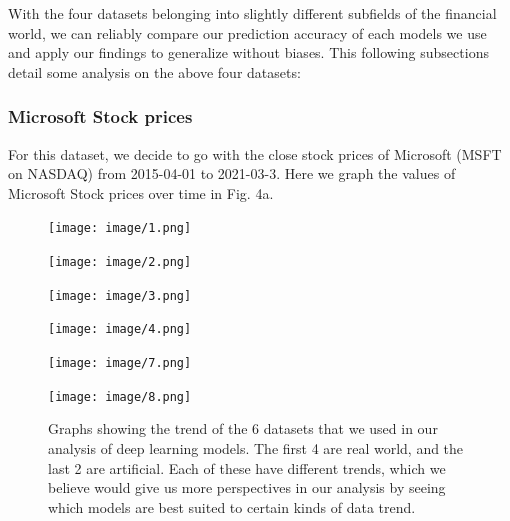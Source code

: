 \documentclass[letterpaper, 10 pt, conference]{ieeeconf}  %
\begin{document}
        With the four datasets belonging into slightly different subfields of the financial world, we can reliably compare our prediction accuracy of each models we use and apply our findings to generalize without biases. This following subsections detail some analysis on the above four datasets:

        \subsubsection{Microsoft Stock prices} For this dataset, we decide to go with the close stock prices of Microsoft (MSFT on NASDAQ) from 2015-04-01 to 2021-03-3. Here we graph the values of Microsoft Stock prices over time in Fig. 4a.
        \begin{figure}
            \centering
            \begin{minipage}{\columnwidth}
                \centering
                \texttt{[image: image/1.png]}
                \label{label1}
            \end{minipage}%
            \begin{minipage}{\columnwidth}
                \centering
                \texttt{[image: image/2.png]}
                \label{label2}
            \end{minipage}
            \begin{minipage}{\columnwidth}
                \centering
                \texttt{[image: image/3.png]}
                \label{label3}
            \end{minipage}%
            \begin{minipage}{\columnwidth}
                \centering
                \texttt{[image: image/4.png]}
                \label{label4}
            \end{minipage}
            \begin{minipage}{\columnwidth}
                \centering
                \texttt{[image: image/7.png]}
                \label{label3}
            \end{minipage}%
            \begin{minipage}{\columnwidth}
                \centering
                \texttt{[image: image/8.png]}
                \label{label4}
            \end{minipage}
            \captionsetup{margin=1.5cm}
            \caption{Graphs showing the trend of the 6 datasets that we used in our analysis of deep learning models. The first 4 are real world, and the last 2 are artificial. Each of these have different trends, which we believe would give us more perspectives in our analysis by seeing which models are best suited to certain kinds of data trend.}
        \end{figure}
\end{document}
